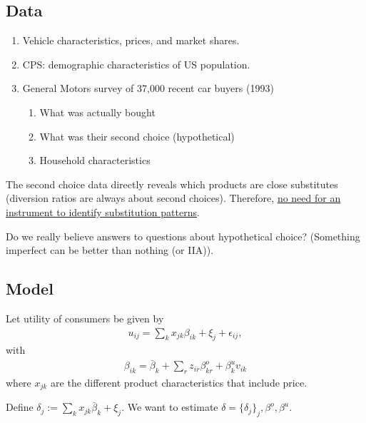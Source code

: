 \documentclass[11pt]{elegantbook}
\begin{document}
\subsection{Data}
\begin{enumerate}
    \item Vehicle characteristics, prices, and market shares.
    \item CPS: demographic characteristics of US population.
    \item General Motors survey of 37,000 recent car buyers (1993)
    \begin{enumerate}
        \item What was actually bought
        \item What was their second choice (hypothetical)
        \item Household characteristics
    \end{enumerate}
\end{enumerate}

The second choice data directly reveals which products are close substitutes (diversion ratios are always about second choices). Therefore, \underline{no need for an instrument to identify substitution patterns}.
\begin{note}
    Do we really believe answers to questions about hypothetical choice? (Something imperfect can be better than nothing (or IIA)).
\end{note}

\subsection{Model}
Let utility of consumers be given by
\begin{equation}
    \begin{aligned}
        u_{ij}=\sum_{k}x_{jk}\beta_{ik}+\xi_{j}+\epsilon_{ij},
    \end{aligned}
    \nonumber
\end{equation}
with
\begin{equation}
    \begin{aligned}
        \beta_{ik}=\bar{\beta}_k+\sum_{r}z_{ir}\beta_{kr}^o+\beta_{k}^u v_{ik}
    \end{aligned}
    \nonumber
\end{equation}
where $x_{jk}$ are the different product characteristics that include price.

Define $\delta_j:=\sum_{k}x_{jk}\bar{\beta}_{k}+\xi_{j}$. We want to estimate $\delta=\{\delta_j\}_j,\beta^o,\beta^u$.
\end{document}
